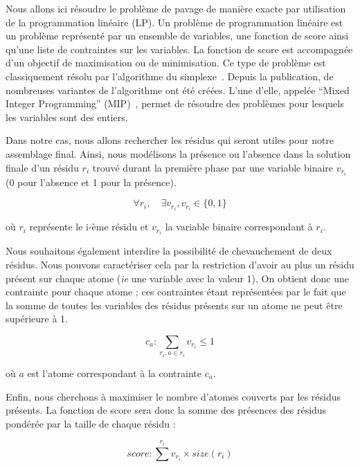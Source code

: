 Nous allons ici résoudre le problème de pavage de manière exacte par utilisation de la programmation linéaire (LP).
Un problème de programmation linéaire est un problème représenté par un ensemble de variables, une fonction de score ainsi qu'une liste de contraintes sur les variables.
La fonction de score est accompagnée d'un objectif de maximisation ou de minimisation.
Ce type de problème est classiquement résolu par l'algorithme du simplexe~\cite{murty_linear_1983}.
Depuis la publication, de nombreuses variantes de l'algorithme ont été créées.
L'une d'elle, appelée ``Mixed Integer Programming'' (MIP)~\cite{wolsey_mixed_2007}, permet de résoudre des problèmes pour lesquels les variables sont des entiers.

Dans notre cas, nous allons rechercher les résidus qui seront utiles pour notre assemblage final.
Ainsi, nous modélisons la présence ou l'absence dans la solution finale d'un résidu $r_i$ trouvé durant la première phase par une
variable binaire $v_{r_i}$ (0 pour l'absence et 1 pour la présence).

\begin{equation}
 \forall r_i, \quad \exists v_{r_i}, v_{r_i} \in \{0, 1\}
\end{equation}

où $r_i$ représente le i-ème résidu et $v_{r_i}$ la variable binaire correspondant à $r_i$.

Nous souhaitons également interdire la possibilité de chevauchement de deux résidus.
Nous pouvons caractériser cela par la restriction d'avoir au plus un résidu présent sur chaque atome (\textit{ie} une variable avec la valeur 1).
On obtient donc une contrainte pour chaque atome ; ces contraintes étant représentées par le fait que la somme de toutes les variables des résidus présents sur un atome ne peut être supérieure à 1.

\begin{equation}
 c_a : \sum_{r_i, a \in r_i} v_{r_i} \leqslant 1
\end{equation}

où $a$ est l'atome correspondant à la contrainte $c_a$.

Enfin, nous cherchons à maximiser le nombre d'atomes couverts par les résidus présents. La fonction de score sera
donc la somme des présences des résidus pondérée par la taille de chaque résidu :

\begin{equation}
 score : \sum^{r_i} v_{r_i} \times size(r_i)
\end{equation}

